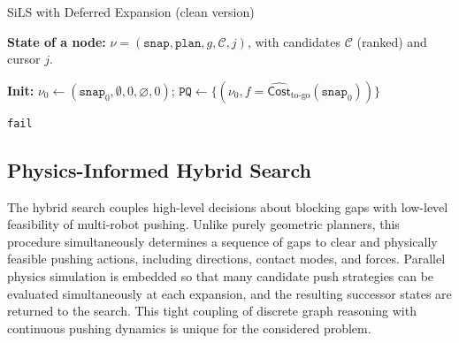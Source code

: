 \begin{algorithm}[t]
\small
\caption{SiLS with Deferred Expansion (clean version)}
\label{alg:SiLS}
\DontPrintSemicolon
{}


\BlankLine
\textbf{State of a node:} $\nu=(\texttt{snap}, \texttt{plan}, g, \mathcal{C}, j)$,
with candidates $\mathcal{C}$ (ranked) and cursor $j$.\;

\BlankLine
\textbf{Init:} $\nu_0\!\leftarrow\!(\texttt{snap}_0,\emptyset,0,\varnothing,0)$;\;
$\texttt{PQ}\!\leftarrow\!\{(\nu_0, f=\widehat{\mathsf{Cost}}_{\text{to-go}}(\texttt{snap}_0))\}$\;

\Return \texttt{fail}\;
\end{algorithm}


\subsection{Physics-Informed Hybrid Search}\label{subsec:simloop}

The hybrid search couples high-level decisions about blocking gaps with
low-level feasibility of multi-robot pushing. Unlike purely geometric
planners, this procedure simultaneously determines a sequence of gaps to clear
and physically feasible pushing actions, including directions, contact modes,
and forces. Parallel physics simulation is embedded so that many candidate
push strategies can be evaluated simultaneously at each expansion, and the resulting
successor states are returned to the search. This tight coupling of discrete
graph reasoning with continuous pushing dynamics is unique for the considered problem.

